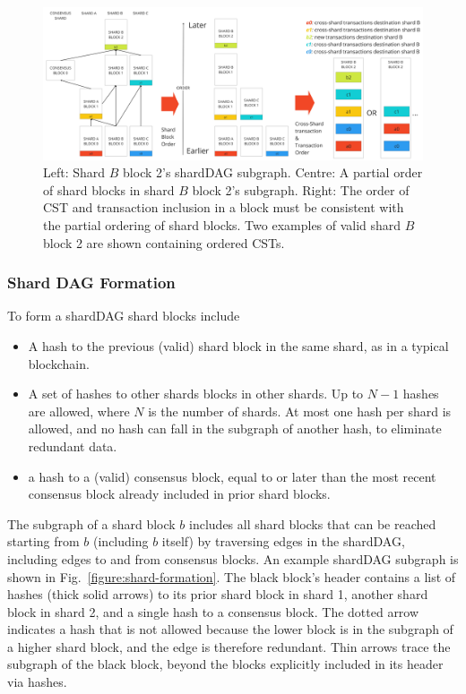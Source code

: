 \begin{figure}
	\centering
	\includegraphics[width=1.0\textwidth]{figures/OrderExample.jpg}
	\caption{Left: Shard $B$ block 2's shardDAG subgraph.
		Centre: A partial order of shard blocks in shard $B$ block 2's subgraph.
		Right: The order of CST and transaction inclusion in a block must be consistent with the partial ordering of shard blocks.
		Two examples of valid shard $B$ block 2 are shown containing ordered CSTs. }
	\label{figure:order-example}
\end{figure}

\subsubsection{Shard DAG Formation}
To form a shardDAG shard blocks include
\begin{itemize}
	\item A hash to the previous (valid) shard block in the same shard, as in a typical blockchain.
	\item A set of hashes to other shards blocks in other shards.
	Up to $N-1$ hashes are allowed, where $N$ is the number of shards. 
	At most one hash per shard is allowed, and no hash can fall in the subgraph of another hash, to eliminate redundant data.
	\item a hash to a (valid) consensus block, equal to or later than the most recent consensus block already included in prior shard blocks.	
\end{itemize}
The subgraph of a shard block $b$ includes all shard blocks that can be reached starting from $b$ (including $b$ itself) by traversing edges in the shardDAG, including edges to and from consensus blocks.
An example shardDAG subgraph is shown in Fig.~\ref{figure:shard-formation}. 
The black block’s header contains a list of hashes (thick solid arrows) to its prior shard block in shard 1, another shard block in shard 2, and a single hash to a consensus block. 
The dotted arrow indicates a hash that is not allowed because the lower block is in the subgraph of a higher shard block, and the edge is therefore redundant. 
Thin arrows trace the subgraph of the black block, beyond the blocks explicitly included in its header via hashes. 


